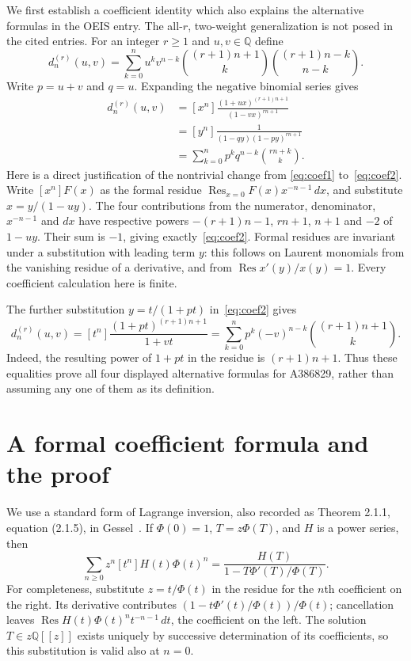 \documentclass[11pt]{article}
\newcommand{\Q}{\mathbb{Q}}
\newcommand{\Res}{\operatorname{Res}}
\begin{document}
We first establish a coefficient identity which also explains the
alternative formulas in the OEIS entry. The all-$r$, two-weight
generalization is not posed in the cited entries. For an integer
$r\geq1$ and $u,v\in\Q$ define
\begin{equation}\label{eq:family}
 d^{(r)}_n(u,v)=\sum_{k=0}^{n}u^kv^{n-k}
 \binom{(r+1)n+1}{k}\binom{(r+1)n-k}{n-k}.
\end{equation}
Write $p=u+v$ and $q=u$. Expanding the negative binomial series gives
\begin{align}
 d^{(r)}_n(u,v)
 &= [x^n]\frac{(1+ux)^{(r+1)n+1}}{(1-vx)^{rn+1}}\label{eq:coef1}\\
 &= [y^n]\frac{1}{(1-qy)(1-py)^{rn+1}}\label{eq:coef2}\\
 &= \sum_{k=0}^{n}p^kq^{n-k}\binom{rn+k}{k}.
 \label{eq:sum2}
\end{align}
Here is a direct justification of the nontrivial change from
\eqref{eq:coef1} to~\eqref{eq:coef2}. Write $[x^n]F(x)$ as the
formal residue $\Res_{x=0} F(x)x^{-n-1}\,dx$, and substitute
$x=y/(1-uy)$. The four contributions from the numerator, denominator,
$x^{-n-1}$ and $dx$ have respective powers
$-(r+1)n-1$, $rn+1$, $n+1$ and $-2$ of $1-uy$.
Their sum is $-1$, giving exactly~\eqref{eq:coef2}.
Formal residues are invariant under a substitution with leading term $y$:
this follows on Laurent monomials from the vanishing residue of a
derivative, and from $\Res x'(y)/x(y)=1$.
Every coefficient calculation here is finite.

The further substitution $y=t/(1+pt)$ in~\eqref{eq:coef2} gives
\begin{equation}\label{eq:sum3}
 d^{(r)}_n(u,v)
 =[t^n]\frac{(1+pt)^{(r+1)n+1}}{1+vt}
 =\sum_{k=0}^{n}p^k(-v)^{n-k}\binom{(r+1)n+1}{k}.
\end{equation}
Indeed, the resulting power of $1+pt$ in the residue is $(r+1)n+1$.
Thus these equalities prove all four displayed alternative formulas
for A386829, rather than assuming any one of them as its definition.

\section{A formal coefficient formula and the proof}
We use a standard form of Lagrange inversion, also recorded as
Theorem 2.1.1, equation (2.1.5), in Gessel~\cite{gessel}.
If $\Phi(0)=1$, $T=z\Phi(T)$, and $H$ is a power series, then
\begin{equation}\label{eq:lagrange}
 \sum_{n\geq0}z^n[t^n]H(t)\Phi(t)^n
 =\frac{H(T)}{1-T\Phi'(T)/\Phi(T)}.
\end{equation}
For completeness, substitute $z=t/\Phi(t)$ in the residue for the
$n$th coefficient on the right. Its derivative contributes
$(1-t\Phi'(t)/\Phi(t))/\Phi(t)$; cancellation leaves
$\Res H(t)\Phi(t)^nt^{-n-1}\,dt$, the coefficient on the left.
The solution $T\in z\Q[[z]]$ exists uniquely by successive determination
of its coefficients, so this substitution is valid also at $n=0$.
\end{document}
